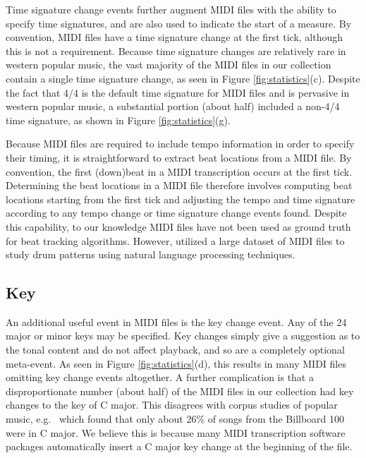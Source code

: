 \documentclass{article}
\begin{document}
Time signature change events further augment MIDI files with the ability to specify time signatures, and are also used to indicate the start of a measure.
By convention, MIDI files have a time signature change at the first tick, although this is not a requirement.
Because time signature changes are relatively rare in western popular music, the vast majority of the MIDI files in our collection contain a single time signature change, as seen in Figure \ref{fig:statistics}(c).
Despite the fact that 4/4 is the default time signature for MIDI files and is pervasive in western popular music, a substantial portion (about half) included a non-4/4 time signature, as shown in Figure \ref{fig:statistics}(g).

Because MIDI files are required to include tempo information in order to specify their timing, it is straightforward to extract beat locations from a MIDI file.
By convention, the first (down)beat in a MIDI transcription occurs at the first tick.
Determining the beat locations in a MIDI file therefore involves computing beat locations starting from the first tick and adjusting the tempo and time signature according to any tempo change or time signature change events found.
Despite this capability, to our knowledge MIDI files have not been used as ground truth for beat tracking algorithms.  %
However, \cite{mauch2012corpus} utilized a large dataset of MIDI files to study drum patterns using natural language processing techniques.


\subsection{Key}
\label{sec:key}

An additional useful event in MIDI files is the key change event.
Any of the 24 major or minor keys may be specified.
Key changes simply give a suggestion as to the tonal content and do not affect playback, and so are a completely optional meta-event.
As seen in Figure \ref{fig:statistics}(d), this results in many MIDI files omitting key change events altogether.
A further complication is that a disproportionate number (about half) of the MIDI files in our collection had key changes to the key of C major.
This disagrees with corpus studies of popular music, e.g.\ \cite{carlton2012analyzed} which found that only about 26\% of songs from the Billboard 100 were in C major.
We believe this is because many MIDI transcription software packages automatically insert a C major key change at the beginning of the file.
\end{document}
